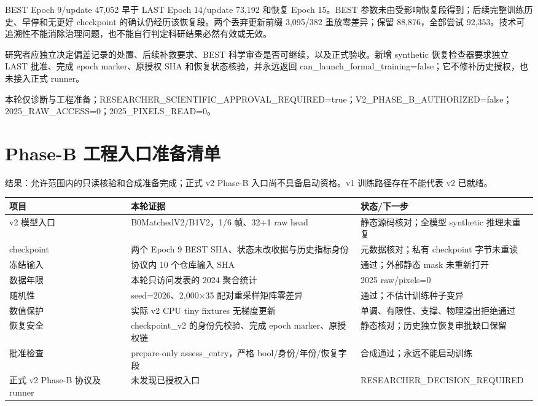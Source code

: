 \documentclass[UTF8,a4paper,10pt,fontset=fandol]{ctexart}
\begin{document}
BEST Epoch 9/update 47,052 早于 LAST Epoch 14/update 73,192 和恢复 Epoch 15。BEST 参数未由受影响恢复段得到；后续完整训练历史、早停和无更好 checkpoint 的确认仍经历该恢复段。两个丢弃更新前缀 3,095/382 重放零差异；保留 88,876，全部尝试 92,353。技术可追溯性不能消除治理问题，也不能自行判定科研结果必然有效或无效。\par

研究者应独立决定偏差记录的处置、后续补救要求、BEST 科学审查是否可继续，以及正式验收。新增 synthetic 恢复检查器要求独立 LAST 批准、完成 epoch marker、原授权 SHA 和恢复状态核验，并永远返回 can\_launch\_formal\_training=false；它不修补历史授权，也未接入正式 runner。\par

本轮仅诊断与工程准备；RESEARCHER\_SCIENTIFIC\_APPROVAL\_REQUIRED=true；V2\_PHASE\_B\_AUTHORIZED=false；2025\_RAW\_ACCESS=0；2025\_PIXELS\_READ=0。\par

\clearpage
\section*{Phase-B 工程入口准备清单}

结果：允许范围内的只读核验和合成准备完成；正式 v2 Phase-B 入口尚不具备启动资格。v1 训练路径存在不能代表 v2 已就绪。\par

\begin{center}\scriptsize\begin{longtable}{@{}p{}p{}p{}@{}}\toprule
项目 & 本轮证据 & 状态/下一步\\
\midrule\endhead
v2 模型入口 & B0MatchedV2/B1V2，1/6 帧、32+1 raw head & 静态源码核对；全模型 synthetic 推理未重复\\
checkpoint & 两个 Epoch 9 BEST SHA、状态未改收据与历史指标身份 & 元数据核对；私有 checkpoint 字节未重读\\
冻结输入 & 协议内 10 个仓库输入 SHA & 通过；外部静态 mask 未重新打开\\
数据年限 & 本轮只访问发表的 2024 聚合统计 & 2025 raw/pixels=0\\
随机性 & seed=2026、2,000×35 配对重采样矩阵零差异 & 通过；不估计训练种子变异\\
数值保护 & 实际 v2 CPU tiny fixtures 无梯度更新 & 单调、有限性、支撑、物理溢出拒绝通过\\
恢复安全 & checkpoint\_v2 的身份先校验、完成 epoch marker、原授权链 & 静态核对；历史独立恢复审批缺口保留\\
批准检查 & prepare-only assess\_entry，严格 bool/身份/年份/恢复字段 & 合成通过；永远不能启动训练\\
正式 v2 Phase-B 协议及 runner & 未发现已授权入口 & RESEARCHER\_DECISION\_REQUIRED\\
\bottomrule\end{longtable}\end{center}\normalsize
\end{document}
